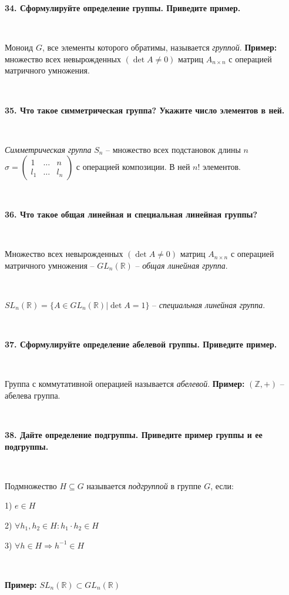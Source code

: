 \documentclass{article}
\begin{document}
	\textbf{34. Сформулируйте определение группы. Приведите пример.}
	
	{
		$\;$
		\setlength{\parindent}{0.4cm}
		\hangindent=0.4cm
		
		Моноид $G$, все элементы которого обратимы, называется \textit{группой}. \textbf{Пример:} множество всех невырожденных $(\det A\ne 0)$ матриц $A_{n\times n}$ с операцией матричного умножения.
		
		$\;$
		\setlength{\parindent}{0cm}
		\hangindent=0cm
	}
	
	\textbf{35. Что такое симметрическая группа? Укажите число элементов в ней.}
	
	{
		$\;$
		\setlength{\parindent}{0.4cm}
		\hangindent=0.4cm
		
		\textit{Симметрическая группа} $S_n$ -- множество всех подстановок длины $n$ {\scriptsize $\sigma=\begin{pmatrix}
		1&\ldots&n\\
		l_1&\ldots&l_n
		\end{pmatrix}$} с операцией композиции. В ней $n!$ элементов.		
	
		$\;$
		\setlength{\parindent}{0cm}
		\hangindent=0cm
	}
	
	\textbf{36. Что такое общая линейная и специальная линейная группы?}
	
	{
		$\;$
		\setlength{\parindent}{0.4cm}
		\hangindent=0.4cm
		
		Множество всех невырожденных $(\det A\ne 0)$ матриц $A_{n\times n}$ с операцией матричного умножения -- $GL_n(\mathbb{R})$ -- \textit{общая линейная  группа}.
		
		$\;$
		
		$SL_n(\mathbb{R})=\{A\in GL_n(\mathbb{R})|\det A=1 \}$ -- \textit{специальная линейная группа}.	
		
		$\;$
		\setlength{\parindent}{0cm}
		\hangindent=0cm
	}
	
	\textbf{37. Сформулируйте определение абелевой группы. Приведите пример.}
	
	{
		$\;$
		\setlength{\parindent}{0.4cm}
		\hangindent=0.4cm
		
		Группа с коммутативной операцией называется \textit{абелевой}. \textbf{Пример:} $(\mathbb{Z}, +)$ -- абелева группа.
		
		$\;$
		\setlength{\parindent}{0cm}
		\hangindent=0cm
	}
	
	\textbf{38. Дайте определение подгруппы. Приведите пример группы и ее подгруппы.}
	
	{
		$\;$
		\setlength{\parindent}{0.4cm}
		\hangindent=0.4cm
		
		
		Подмножество $H\subseteq G$ называется \textit{подгруппой} в группе $G$, если:
		
		1) $e\in H$
		
		2) $\forall h_1, h_2\in H: h_1\cdot h_2\in H$
		
		3) $\forall h\in H\Rightarrow h^{-1}\in H$
		
		$\;$
		
		\textbf{Пример:} $SL_n(\mathbb{R})\subset GL_n(\mathbb{R})$\\
		
		$\;$
		\setlength{\parindent}{0cm}
		\hangindent=0cm
	}
	
\end{document}
